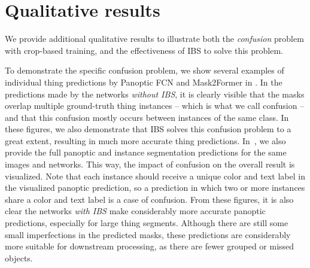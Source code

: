 \documentclass[10pt,twocolumn,letterpaper]{article}
\begin{document}
\section{Qualitative results}
\label{sec:app:qual_results}
We provide additional qualitative results to illustrate both the \textit{confusion} problem with crop-based training, and the effectiveness of IBS to solve this problem. 

To demonstrate the specific confusion problem, we show several examples of individual thing predictions by Panoptic FCN and Mask2Former in . In the predictions made by the networks \textit{without IBS}, it is clearly visible that the masks overlap multiple ground-truth thing instances -- which is what we call confusion -- and that this confusion mostly occurs between instances of the same class. In these figures, we also demonstrate that IBS solves this confusion problem to a great extent, resulting in much more accurate thing predictions. In~, we also provide the full panoptic and instance segmentation predictions for the same images and networks. This way, the impact of confusion on the overall result is visualized. Note that each instance should receive a unique color and text label in the visualized panoptic prediction, so a prediction in which two or more instances share a color and text label is a case of confusion. From these figures, it is also clear the networks \textit{with IBS} make considerably more accurate panoptic predictions, especially for large thing segments. Although there are still some small imperfections in the predicted masks, these predictions are considerably more suitable for downstream processing, as there are fewer grouped or missed objects.
\end{document}

